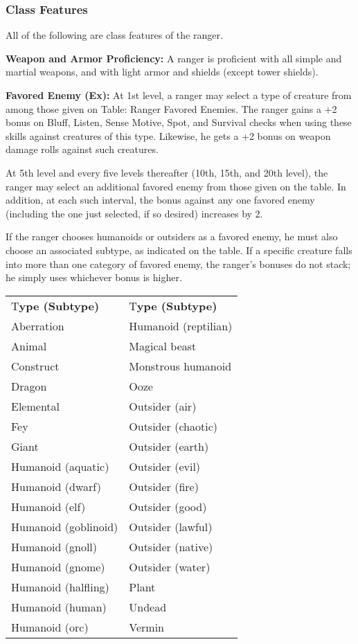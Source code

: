 \documentclass{article}
\begin{document}
\subsubsection*{\textbf{Class Features}}

All of the following are class features of the ranger.

\textbf{Weapon and Armor Proficiency:} A ranger is proficient with all simple and 
martial weapons, and with light armor and shields (except tower shields).

\textbf{Favored Enemy (Ex):} At 1st level, a ranger may select a type of creature 
from among those given on Table: Ranger Favored Enemies. The ranger gains a +2 
bonus on Bluff, Listen, Sense Motive, Spot, and Survival checks when using these 
skills against creatures of this type. Likewise, he gets a +2 bonus on weapon damage 
rolls against such creatures.

At 5th level and every five levels thereafter (10th, 15th, and 20th level), the 
ranger may select an additional favored enemy from those given on the table. In 
addition, at each such interval, the bonus against any one favored enemy (including 
the one just selected, if so desired) increases by 2. 

If the ranger chooses humanoids or outsiders as a favored enemy, he must also choose 
an associated subtype, as indicated on the table. If a specific creature falls 
into more than one category of favored enemy, the ranger's bonuses do not stack; 
he simply uses whichever bonus is higher.

\vspace{12pt}
\begin{tabular}{|>{\raggedright}p{88pt}|>{\raggedright}p{84pt}|}
\hline
\multicolumn{2}{|p{172pt}|}{T\textbf{able: Ranger Favored Enemies}}\tabularnewline
\hline
T\textbf{ype (Subtype)} & T\textbf{ype (Subtype)}\tabularnewline
\hline
Aberration & Humanoid (reptilian) \tabularnewline
\hline
Animal & Magical beast \tabularnewline
\hline
Construct & Monstrous humanoid \tabularnewline
\hline
Dragon  & Ooze \tabularnewline
\hline
Elemental & Outsider (air) \tabularnewline
\hline
Fey & Outsider (chaotic) \tabularnewline
\hline
Giant & Outsider (earth) \tabularnewline
\hline
Humanoid (aquatic) & Outsider (evil) \tabularnewline
\hline
Humanoid (dwarf)  & Outsider (fire) \tabularnewline
\hline
Humanoid (elf)  & Outsider (good)\tabularnewline
\hline
Humanoid (goblinoid)  & Outsider (lawful)\tabularnewline
\hline
Humanoid (gnoll)  & Outsider (native)\tabularnewline
\hline
Humanoid (gnome) & Outsider (water) \tabularnewline
\hline
Humanoid (halfling)  & Plant \tabularnewline
\hline
Humanoid (human)  & Undead \tabularnewline
\hline
Humanoid (orc)  & Vermin \tabularnewline
\hline
\end{tabular}
\end{document}
